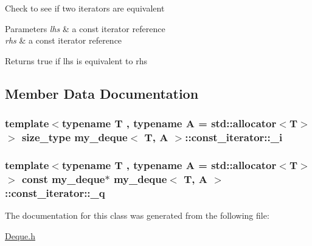 Check to see if two iterators are equivalent 
\begin{DoxyParams}{Parameters}
{\em lhs} & a const iterator reference \\
\hline
{\em rhs} & a const iterator reference \\
\hline
\end{DoxyParams}
\begin{DoxyReturn}{Returns}
true if lhs is equivalent to rhs 
\end{DoxyReturn}


\subsection{Member Data Documentation}
\hypertarget{classmy__deque_1_1const__iterator_a96e9c925cd20cfbbd18b9f5891bee5ff}{
\subsubsection[{\-\_\-i}]{\setlength{\rightskip}{0pt plus 5cm}template$<$typename T , typename A  = std\-::allocator$<$\-T$>$$>$ {\bf size\-\_\-type} {\bf my\-\_\-deque}$<$ T, A $>$\-::const\-\_\-iterator\-::\-\_\-i\hspace{0.3cm}{\ttfamily [private]}}}\label{classmy__deque_1_1const__iterator_a96e9c925cd20cfbbd18b9f5891bee5ff}
\hypertarget{classmy__deque_1_1const__iterator_a9bb01f756f5c5e283d8d83d3fcae876a}{
\subsubsection[{\-\_\-q}]{\setlength{\rightskip}{0pt plus 5cm}template$<$typename T , typename A  = std\-::allocator$<$\-T$>$$>$ const {\bf my\-\_\-deque}$\ast$ {\bf my\-\_\-deque}$<$ T, A $>$\-::const\-\_\-iterator\-::\-\_\-q\hspace{0.3cm}{\ttfamily [private]}}}\label{classmy__deque_1_1const__iterator_a9bb01f756f5c5e283d8d83d3fcae876a}


The documentation for this class was generated from the following file\-:\begin{DoxyCompactItemize}
\item 
\hyperlink{Deque_8h}{Deque.\-h}\end{DoxyCompactItemize}
